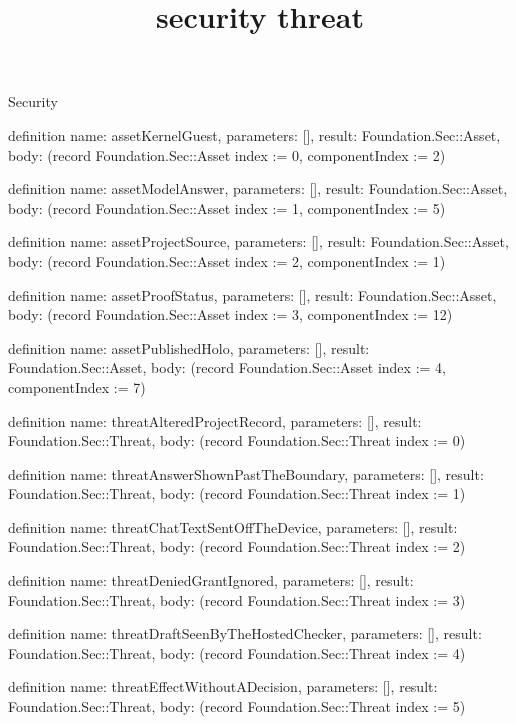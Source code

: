 \begin{lexlean}{Security}
\title{security threat}
\begin{semanticmodule}
definition{
  name: assetKernelGuest,
  parameters: [],
  result: Foundation.Sec::Asset,
  body: (record Foundation.Sec::Asset {index := 0, componentIndex := 2})
}

definition{
  name: assetModelAnswer,
  parameters: [],
  result: Foundation.Sec::Asset,
  body: (record Foundation.Sec::Asset {index := 1, componentIndex := 5})
}

definition{
  name: assetProjectSource,
  parameters: [],
  result: Foundation.Sec::Asset,
  body: (record Foundation.Sec::Asset {index := 2, componentIndex := 1})
}

definition{
  name: assetProofStatus,
  parameters: [],
  result: Foundation.Sec::Asset,
  body: (record Foundation.Sec::Asset {index := 3, componentIndex := 12})
}

definition{
  name: assetPublishedHolo,
  parameters: [],
  result: Foundation.Sec::Asset,
  body: (record Foundation.Sec::Asset {index := 4, componentIndex := 7})
}

definition{
  name: threatAlteredProjectRecord,
  parameters: [],
  result: Foundation.Sec::Threat,
  body: (record Foundation.Sec::Threat {index := 0})
}

definition{
  name: threatAnswerShownPastTheBoundary,
  parameters: [],
  result: Foundation.Sec::Threat,
  body: (record Foundation.Sec::Threat {index := 1})
}

definition{
  name: threatChatTextSentOffTheDevice,
  parameters: [],
  result: Foundation.Sec::Threat,
  body: (record Foundation.Sec::Threat {index := 2})
}

definition{
  name: threatDeniedGrantIgnored,
  parameters: [],
  result: Foundation.Sec::Threat,
  body: (record Foundation.Sec::Threat {index := 3})
}

definition{
  name: threatDraftSeenByTheHostedChecker,
  parameters: [],
  result: Foundation.Sec::Threat,
  body: (record Foundation.Sec::Threat {index := 4})
}

definition{
  name: threatEffectWithoutADecision,
  parameters: [],
  result: Foundation.Sec::Threat,
  body: (record Foundation.Sec::Threat {index := 5})
}


\end{semanticmodule}
\end{lexlean}
